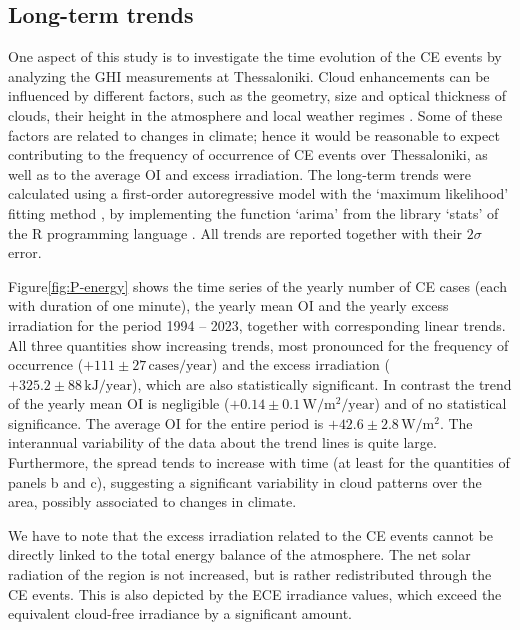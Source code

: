 \documentclass[preprint, 5p,
authoryear]{elsarticle} %
\begin{document}
\hypertarget{long-term-trends}{%
\subsection{Long-term trends}\label{long-term-trends}}

One aspect of this study is to investigate the time evolution of the CE
events by analyzing the GHI measurements at Thessaloniki. Cloud
enhancements can be influenced by different factors, such as the
geometry, size and optical thickness of clouds, their height in the
atmosphere and local weather regimes
\citep{Mol2023, Veerman2022, Gristey2022, Tzoumanikas2016}. Some of
these factors are related to changes in climate; hence it would be
reasonable to expect contributing to the frequency of occurrence of CE
events over Thessaloniki, as well as to the average OI and excess
irradiation. The long-term trends were calculated using a first-order
autoregressive model with the `maximum likelihood' fitting method
\citep{Gardner1980, Jones1980}, by implementing the function `arima'
from the library `stats' of the R programming language \citep{RCT2023}.
All trends are reported together with their \(2\sigma\) error.

Figure\nobreakspace{}\ref{fig:P-energy} shows the time series of the
yearly number of CE cases (each with duration of one minute), the yearly
mean OI and the yearly excess irradiation for the period 1994 -- 2023,
together with corresponding linear trends. All three quantities show
increasing trends, most pronounced for the frequency of occurrence
(\(+111\pm 27\,\text{cases}/\text{year}\)) and the excess irradiation
(\(+325.2 \pm 88\,\text{kJ}/\text{year}\)), which are also statistically
significant. In contrast the trend of the yearly mean OI is negligible
(\(+0.14\pm 0.1\,\text{W}/\text{m}^2/\text{year}\)) and of no
statistical significance. The average OI for the entire period is
\(+42.6\pm 2.8\,\text{W}/\text{m}^2\). The interannual variability of
the data about the trend lines is quite large. Furthermore, the spread
tends to increase with time (at least for the quantities of panels b and
c), suggesting a significant variability in cloud patterns over the
area, possibly associated to changes in climate.

We have to note that the excess irradiation related to the CE events
cannot be directly linked to the total energy balance of the atmosphere.
The net solar radiation of the region is not increased, but is rather
redistributed through the CE events. This is also depicted by the ECE
irradiance values, which exceed the equivalent cloud-free irradiance by
a significant amount.
\end{document}
